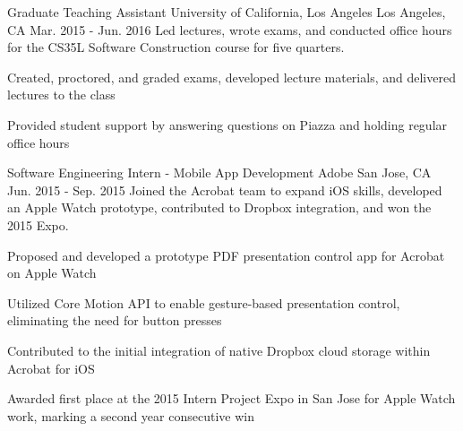 
%
% 
% 
%
%
%
%
%
% 

\begin{cventries}

\cventry
    {Graduate Teaching Assistant} %
    {University of California, Los Angeles} %
    {Los Angeles, CA} %
    {Mar. 2015 - Jun. 2016} %
    {Led lectures, wrote exams, and conducted office hours for the CS35L Software Construction course for five quarters.} %
    {
      \begin{cvitems} %
        \item {Created, proctored, and graded exams, developed lecture materials, and delivered lectures to the class}
        \item {Provided student support by answering questions on Piazza and holding regular office hours}
      \end{cvitems}
    }

\cventry
    {Software Engineering Intern - Mobile App Development} %
    {Adobe} %
    {San Jose, CA} %
    {Jun. 2015 - Sep. 2015} %
    {Joined the Acrobat team to expand iOS skills, developed an Apple Watch prototype, contributed to Dropbox integration, and won the 2015 Expo.} %
    {
      \begin{cvitems} %
        \item {Proposed and developed a prototype PDF presentation control app for Acrobat on Apple Watch}
        \item {Utilized Core Motion API to enable gesture-based presentation control, eliminating the need for button presses}
        \item {Contributed to the initial integration of native Dropbox cloud storage within Acrobat for iOS}
        \item {Awarded first place at the 2015 Intern Project Expo in San Jose for Apple Watch work, marking a second year consecutive win}
      \end{cvitems}
    }


\end{cventries}
